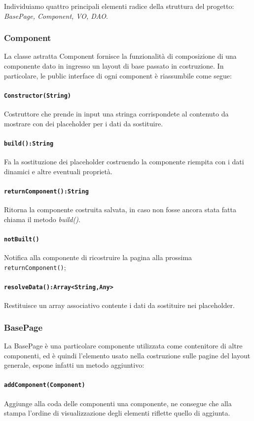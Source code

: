 \documentclass[12pt, a4paper]{article}
\begin{document}
    Individuiamo quattro principali elementi radice della struttura del progetto: \emph{BasePage, Component, VO, DAO}.

    \subsubsection{Component}
    La classe astratta Component fornisce la funzionalità di composizione di una componente dato in ingresso un
    layout di base passato in costruzione. In particolare, le public interface di ogni component è riassumbile come segue:
    \paragraph{\texttt{Constructor(String)}} Costruttore che prende in input una stringa corrispondete al contenuto da mostrare con dei placeholder per i dati da sostituire.
    \paragraph{\texttt{build():String}} Fa la sostituzione dei placeholder costruendo la componente riempita con i dati dinamici e altre eventuali proprietà.
    \paragraph{\texttt{returnComponent():String}} Ritorna la componente costruita salvata, in caso non fosse ancora stata fatta chiama il metodo \emph{build()}.
    \paragraph{\texttt{notBuilt()}} Notifica alla componente di ricostruire la pagina alla prossima \texttt{returnComponent()};
    \paragraph{\texttt{resolveData():Array<String,Any>}} Restituisce un array associativo contente i dati da sostituire nei placeholder.

    \subsubsection{BasePage}
    La BasePage è una particolare componente utilizzata come contenitore di altre componenti, ed è quindi l'elemento usato
    nella costruzione sulle pagine del layout generale, espone infatti un metodo aggiuntivo:
    \paragraph{\texttt{addComponent(Component)}} Aggiunge alla coda delle componenti una componente,
    ne consegue che alla stampa l'ordine di visualizzazione degli elementi riflette quello di aggiunta.
\end{document}
